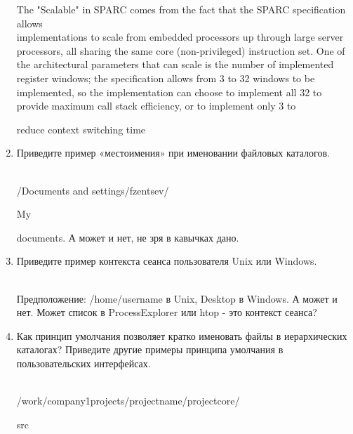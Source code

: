 \documentclass[12pt, a4paper]{article}
\begin{document}
\begin{enumerate}
      The "Scalable" in SPARC comes from the fact that the SPARC specification allows 
     \\ implementations to scale from embedded processors up through large server processors, all sharing the same core (non-privileged) instruction set. One of the architectural parameters that can scale is the number of implemented register windows; the specification allows from 3 to 32 windows to be implemented, so the implementation can choose to implement all 32 to provide maximum call stack efficiency, or to implement only 3 to \begin{it}reduce context switching time\end{it}

  \item \begin{bf}Приведите пример «местоимения» при именовании файловых каталогов.\end{bf} \\

    /Documents and settings/fzentsev/\begin{it}My\end{it} documents. А может и нет, не зря в кавычках дано.

  \item \begin{bf} Приведите пример контекста сеанса пользователя Unix или Windows. \end{bf} \\

      Предположение: /home/username в Unix, Desktop в Windows. А может и нет. Может список в ProcessExplorer или htop - это контекст сеанса?

  \item \begin{bf} Как принцип умолчания позволяет кратко именовать файлы в иерархических каталогах? Приведите другие примеры принципа умолчания в пользовательских интерфейсах. \end{bf} \\

    /work/company1projects/projectname/projectcore/\begin{it}src\end{it}

\end{enumerate}
\end{document}
